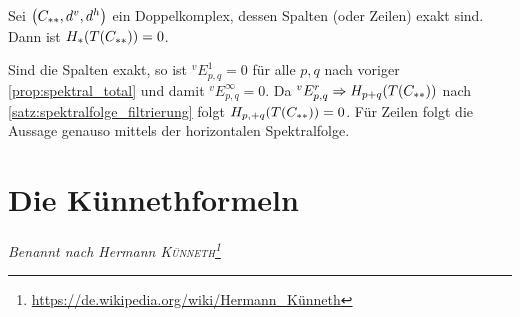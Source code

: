 \begin{korollar}[{name=[{Homologie des Totalkomplexes bei exakten Spalten/Zeilen}]}]
	Sei $\enbrace*{C_{**},d^v,d^h}$ ein Doppelkomplex, dessen Spalten (oder Zeilen) exakt sind.
	Dann ist $H_* \enbrace*{T(C_{**})}=0$.
\end{korollar}
\begin{beweis}
	Sind die Spalten exakt, so ist $^vE^1_{p,q}=0$ für alle $p,q$ nach voriger \autoref{prop:spektral_total} und damit $^vE^\infty_{p,q}=0$.
	Da $^v E^r_{p,q} \Rightarrow H_{p+q} \enbrace*{T(C_{**})}$ nach \autoref{satz:spektralfolge_filtrierung} folgt $H_{p,+q} \enbrace*{T(C_{**})}=0$.
	Für Zeilen folgt die Aussage genauso mittels der horizontalen Spektralfolge.
\end{beweis}
\newpage

\section{Die Künnethformeln} %
\label{sec:16}
\emph{Benannt nach Hermann \textsc{Künneth}\footnote{\url{https://de.wikipedia.org/wiki/Hermann_Künneth}}}

